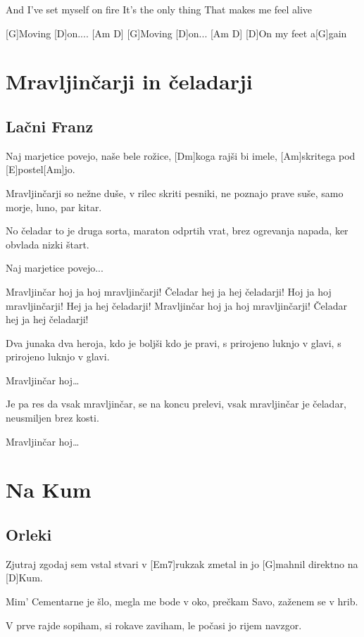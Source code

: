 \documentclass[a4paper,12pt]{article}
\begin{document}
\begin{multicols}{2}
\begin{guitar}
And I've set myself on fire
It's the only thing
That makes me feel alive

[G]Moving [D]on.... [Am D]
[G]Moving [D]on...  [Am D]
[D]On my feet a[G]gain
\end{guitar}
\section{Mravljinčarji in čeladarji}
\subsection*{Lačni Franz}
\begin{guitar}
[Am]Naj marjetice povejo, naše bele rožice,
[Dm]koga rajši bi imele, [Am]skritega pod [E]postel[Am]jo. 


Mravljinčarji so nežne duše, 
v rilec skriti pesniki,
ne poznajo prave suše, 
samo morje, luno, par kitar.


No čeladar to je druga sorta,
maraton odprtih vrat,
brez ogrevanja napada,
ker obvlada nizki štart. 


Naj marjetice povejo... 


Mravljinčar hoj ja hoj mravljinčarji!
Čeladar hej ja hej čeladarji!
Hoj ja hoj mravljinčarji!
Hej ja hej čeladarji!
Mravljinčar hoj ja hoj mravljinčarji!
Čeladar hej ja hej čeladarji! 


Dva junaka dva heroja, 
kdo je boljši kdo je pravi,
s prirojeno luknjo v glavi,
s prirojeno luknjo v glavi. 


Mravljinčar hoj…


Je pa res da vsak mravljinčar,
se na koncu prelevi,
vsak mravljinčar je čeladar,
neusmiljen brez kosti. 


Mravljinčar hoj…

\end{guitar}
\section{Na Kum}
\subsection*{Orleki}
\begin{guitar}
[D]Zjutraj zgodaj sem vstal
stvari v [Em7]rukzak zmetal
in jo [G]mahnil direktno na [D]Kum.


Mim' Cementarne je šlo,
megla me bode v oko,
prečkam Savo, zaženem se v hrib.


V prve rajde sopiham,
si rokave zaviham,
le počasi jo rijem navzgor.



\end{guitar}
\end{multicols}
\end{document}
